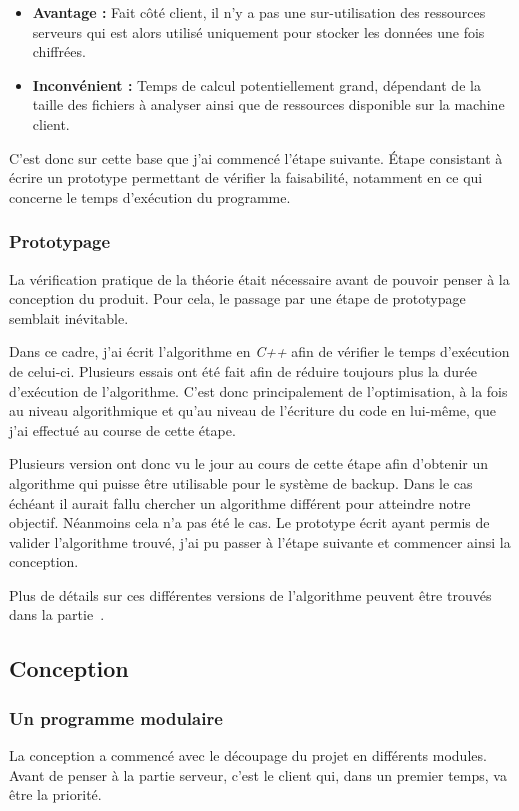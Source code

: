 \documentclass[a4paper,10pt, twoside]{report}
\begin{document}
\begin{spacing}{1.2}
\begin{itemize}
 \item \textbf{Avantage :} Fait c\^ot\'e client, il n'y a pas une
 sur-utilisation des ressources serveurs qui est alors utilis\'e uniquement
 pour stocker les donn\'ees une fois chiffr\'ees.
 
 \item \textbf{Inconv\'enient :} Temps de calcul potentiellement grand,
 d\'ependant de la taille des fichiers \`a analyser ainsi que de ressources
 disponible sur la machine client.
\end{itemize}

C'est donc sur cette base que j'ai commenc\'e l'\'etape suivante. \'Etape 
consistant \`a \'ecrire un prototype permettant de v\'erifier la faisabilit\'e,
notamment en ce qui concerne le temps d'ex\'ecution du programme.

\subsubsection{Prototypage}
La v\'erification pratique de la th\'eorie \'etait n\'ecessaire avant de
pouvoir penser \`a la conception du produit. Pour cela, le passage par une
\'etape de prototypage semblait in\'evitable.

Dans ce cadre, j'ai \'ecrit l'algorithme en \textit{C++} afin de v\'erifier
le temps d'ex\'ecution de celui-ci. Plusieurs essais ont \'et\'e fait afin de
r\'eduire toujours plus la dur\'ee d'ex\'ecution de l'algorithme. C'est donc
principalement de l'optimisation, \`a la fois au niveau algorithmique et
qu'au niveau de l'\'ecriture du code en lui-m\^eme, que j'ai effectu\'e  au
course de cette \'etape.

Plusieurs version ont donc vu le jour au cours de cette \'etape afin d'obtenir
un algorithme qui puisse \^etre utilisable pour le syst\`eme de backup. Dans
le cas \'ech\'eant il aurait fallu chercher un algorithme diff\'erent pour
atteindre notre objectif. N\'eanmoins cela n'a pas \'et\'e le cas. Le
prototype \'ecrit ayant permis de valider l'algorithme trouv\'e, j'ai pu passer
\`a l'\'etape suivante et commencer ainsi la conception.

Plus de d\'etails sur ces diff\'erentes versions de l'algorithme peuvent \^etre
trouv\'es dans la partie~.

\subsection{Conception}
\subsubsection{Un programme modulaire}
La conception a commenc\'e avec le d\'ecoupage du projet en diff\'erents
modules. Avant de penser \`a la partie serveur, c'est le client qui, dans un
premier temps, va \^etre la priorit\'e.


\end{spacing}
\end{document}
